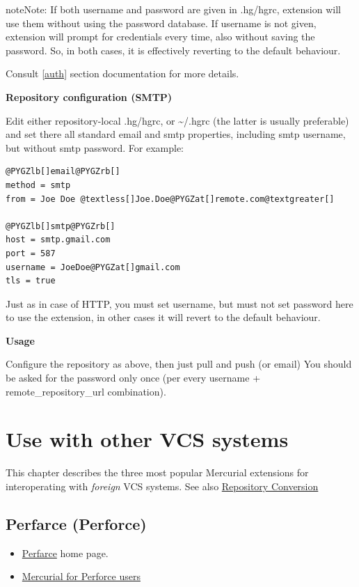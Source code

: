 \documentclass[letterpaper,10pt,english]{manual}
\begin{document}
\begin{notice}{note}{Note:}
If both username and password are given in .hg/hgrc, extension will
use them without using the password database. If username is not
given, extension will prompt for credentials every time, also
without saving the password. So, in both cases, it is effectively
reverting to the default behaviour.
\end{notice}

Consult \href{http://www.selenic.com/mercurial/hgrc.5.html\#auth}{{[}auth{]}}
section documentation for more details.

\textbf{Repository configuration (SMTP)}

Edit either repository-local .hg/hgrc, or \textasciitilde{}/.hgrc (the latter is usually
preferable) and set there all standard email and smtp properties, including
smtp username, but without smtp password. For example:

\begin{Verbatim}[commandchars=@\[\]]
@PYGZlb[]email@PYGZrb[]
method = smtp
from = Joe Doe @textless[]Joe.Doe@PYGZat[]remote.com@textgreater[]

@PYGZlb[]smtp@PYGZrb[]
host = smtp.gmail.com
port = 587
username = JoeDoe@PYGZat[]gmail.com
tls = true
\end{Verbatim}

Just as in case of HTTP, you must set username, but must not set password here
to use the extension, in other cases it will revert to the default behaviour.

\textbf{Usage}

Configure the repository as above, then just pull and push (or email) You
should be asked for the password only once (per every username +
remote\_repository\_url combination).

\resetcurrentobjects
\hypertarget{--doc-nonhg}{}

\chapter{Use with other VCS systems}
\hypertarget{module-nonhg}{}
This chapter describes the three most popular Mercurial extensions for
interoperating with \emph{foreign} VCS systems.  See also \href{http://mercurial.selenic.com/wiki/RepositoryConversion}{Repository
Conversion}


\section{Perfarce (Perforce)}
\begin{itemize}
\item {} 
\href{http://www.kingswood-consulting.co.uk/hg/perfarce/}{Perfarce} home page.

\item {} 
\href{http://mercurial.selenic.com/wiki/PerforceConcepts}{Mercurial for Perforce users}

\end{itemize}
\end{document}
